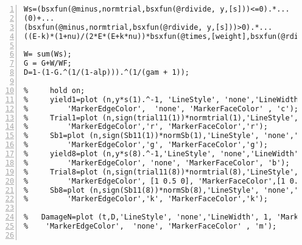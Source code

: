 \begin{lstlisting}[numbers=left, numberstyle=\tiny, keywordstyle=\color{blue!100}, commentstyle=\color{red!30!green!100!blue!100}, frame=shadowbox, rulesepcolor=\color{red!20!green!20!blue!20}]
Ws=(bsxfun(@minus,normtrial,bsxfun(@rdivide, y,[s]))<=0).*...
(0)+...
(bsxfun(@minus,normtrial,bsxfun(@rdivide, y,[s]))>0).*...
((E-k)*(1+nu)/(2*E*(E+k*nu))*bsxfun(@times,[weight],bsxfun(@rdivide,bsxfun(@times,bsxfun(@minus,normtrial,bsxfun(@rdivide, y,[s])),y),[s])));

W= sum(Ws);
G = G+W/WF;
D=1-(1-G.^(1/(1-alp))).^(1/(gam + 1));

%     hold on;
%     yield1=plot (n,y*s(1).^-1, 'LineStyle', 'none','LineWidth', 1, 'Marker', 'o', 'MarkerSize', 10, ...
%         'MarkerEdgeColor',  'none', 'MarkerFaceColor' , 'c');
%     Trial1=plot (n,sign(trial11(1))*normtrial(1),'LineStyle', 'none','LineWidth', 1,'Marker', '^', 'MarkerSize', 10, ...
%         'MarkerEdgeColor','r', 'MarkerFaceColor','r');
%     Sb1=plot (n,sign(Sb11(1))*normSb(1),'LineStyle', 'none','LineWidth', 1,'Marker', 'v', 'MarkerSize', 10, ...
%         'MarkerEdgeColor','g', 'MarkerFaceColor','g');
%     yield8=plot (n,y*s(8).^-1,'LineStyle', 'none','LineWidth', 1,'Marker', 'o', 'MarkerSize', 10, ...
%         'MarkerEdgeColor', 'none', 'MarkerFaceColor', 'b');
%     Trial8=plot (n,sign(trial11(8))*normtrial(8),'LineStyle', 'none','LineWidth', 1,'Marker', '^', 'MarkerSize', 10, ...
%         'MarkerEdgeColor', [1 0.5 0], 'MarkerFaceColor',[1 0.5 0]);
%     Sb8=plot (n,sign(Sb11(8))*normSb(8),'LineStyle', 'none','LineWidth', 1,'Marker', 'v', 'MarkerSize', 10, ...
%         'MarkerEdgeColor','k', 'MarkerFaceColor','k');

%   DamageN=plot (t,D,'LineStyle', 'none','LineWidth', 1, 'Marker', 'o', 'MarkerSize', 6, ...
%    'MarkerEdgeColor',  'none', 'MarkerFaceColor' , 'm');


\end{lstlisting}
